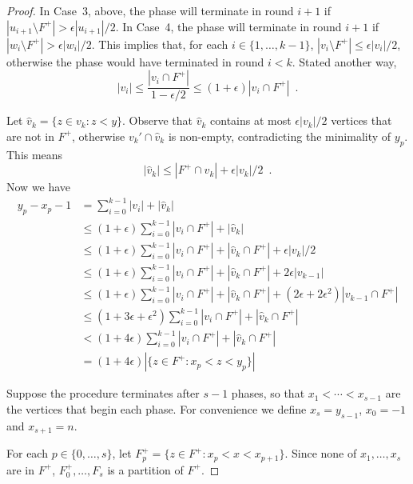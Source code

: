 \documentclass{patmorin}
\begin{document}
\begin{proof}
  In Case~3, above, the phase will terminate in round $i+1$ if
  $|u_{i+1}\setminus F^+|>\epsilon|u_{i+1}|/2$.  In Case~4, the phase
  will terminate in round $i+1$ if $|w_i\setminus F^+|>\epsilon|w_i|/2$.
  This implies that, for each $i\in\{1,\ldots,k-1\}$, $|v_i\setminus
  F^+|\le\epsilon|v_i|/2$, otherwise the phase would have terminated
  in round $i<k$.  Stated another way,
  \[
	  |v_i|\le \frac{|v_i\cap F^+|}{1-\epsilon/2} \le (1+\epsilon)|v_i\cap F^+| \enspace .
  \]

  Let $\hat{v}_k=\{z\in v_k:z< y\}$.  Observe that $\hat{v}_k$ contains
  at most $\epsilon|v_k|/2$ vertices that are not in $F^+$, otherwise
  $v_k'\cap \hat{v}_k$ is non-empty, contradicting the minimality of $y_p$. 
  This means
  \[    |\hat{v}_k| \le |F^+\cap \hat{v}_k| + \epsilon|v_k|/2 \enspace .
  \]
  Now we have
  \begin{align*}
	  y_p - x_p - 1 & = \sum_{i=0}^{k-1} |v_i| + |\hat{v}_k|  \\
	  & \le (1+\epsilon)\sum_{i=0}^{k-1} |v_i\cap F^+| + |\hat{v}_k| \\
	  & \le (1+\epsilon)\sum_{i=0}^{k-1} |v_i\cap F^+| + |\hat{v}_k\cap F^+| + \epsilon|v_k|/2 \\ 
	  & \le  (1+\epsilon)\sum_{i=0}^{k-1}|v_i\cap F^+| + |\hat{v}_k\cap F^+| + 2\epsilon|v_{k-1}| \\ 
	  & \le  (1+\epsilon)\sum_{i=0}^{k-1}|v_i\cap F^+| + |\hat{v}_k\cap F^+| + (2\epsilon+2\epsilon^2)|v_{k-1}\cap F^+| \\ 
	  & \le  (1+3\epsilon+\epsilon^2)\sum_{i=0}^{k-1}|v_i\cap F^+| + |\hat{v}_k\cap F^+| \\
	  & <  (1+4\epsilon)\sum_{i=0}^{k-1}|v_i\cap F^+| + |\hat{v}_k\cap F^+|  \\
	  & =  (1+4\epsilon)|\{z\in F^+: x_p< z< y_p\}|
  \end{align*}

  Suppose the procedure terminates after $s-1$ phases, so that $x_1<\cdots<x_{s-1}$ are the vertices that begin each phase.  For convenience we define $x_s=y_{s-1}$, $x_0=-1$ and $x_{s+1}=n$.

  For each $p\in\{0,\ldots,s\}$, let $F_p^+=\{z\in F^+: x_p <
  x < x_{p+1}\}$.  Since none of $x_1,\ldots,x_s$ are in $F^+$,
  $F_0^+,\ldots,F_{s}$ is a partition of $F^+$.  


\end{proof}
\end{document}
